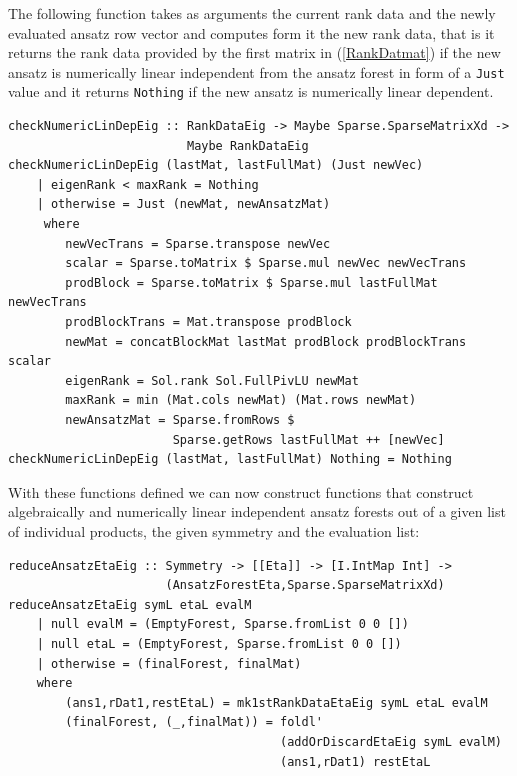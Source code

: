 \documentclass[a4paper,12pt, DIV=14, BCOR=5mm, twoside, headsepline]{scrbook}
\begin{document}
The following function takes as arguments the current rank data and the newly evaluated ansatz row vector and computes form it the new rank data, that is it returns the rank data provided by the first matrix in (\ref{RankDatmat}) if the new ansatz is numerically linear independent from the ansatz forest in form of a \texttt{Just} value and it returns \texttt{Nothing} if the new ansatz is numerically linear dependent. 

\begin{samepage}
\begin{verbatim}
checkNumericLinDepEig :: RankDataEig -> Maybe Sparse.SparseMatrixXd ->
                         Maybe RankDataEig
checkNumericLinDepEig (lastMat, lastFullMat) (Just newVec)
    | eigenRank < maxRank = Nothing
    | otherwise = Just (newMat, newAnsatzMat)
     where
        newVecTrans = Sparse.transpose newVec
        scalar = Sparse.toMatrix $ Sparse.mul newVec newVecTrans
        prodBlock = Sparse.toMatrix $ Sparse.mul lastFullMat newVecTrans
        prodBlockTrans = Mat.transpose prodBlock
        newMat = concatBlockMat lastMat prodBlock prodBlockTrans scalar
        eigenRank = Sol.rank Sol.FullPivLU newMat
        maxRank = min (Mat.cols newMat) (Mat.rows newMat)
        newAnsatzMat = Sparse.fromRows $ 
                       Sparse.getRows lastFullMat ++ [newVec]
checkNumericLinDepEig (lastMat, lastFullMat) Nothing = Nothing
\end{verbatim} 
\end{samepage}

With these functions defined we can now construct functions that construct algebraically and numerically linear independent ansatz forests out of a given list of individual products, the given symmetry and the evaluation list:

\begin{samepage}
\begin{verbatim}
reduceAnsatzEtaEig :: Symmetry -> [[Eta]] -> [I.IntMap Int] ->
                      (AnsatzForestEta,Sparse.SparseMatrixXd)
reduceAnsatzEtaEig symL etaL evalM
    | null evalM = (EmptyForest, Sparse.fromList 0 0 [])
    | null etaL = (EmptyForest, Sparse.fromList 0 0 [])
    | otherwise = (finalForest, finalMat)
    where
        (ans1,rDat1,restEtaL) = mk1stRankDataEtaEig symL etaL evalM
        (finalForest, (_,finalMat)) = foldl' 
                                      (addOrDiscardEtaEig symL evalM)
                                      (ans1,rDat1) restEtaL
\end{verbatim} 
\end{samepage}
\end{document}
